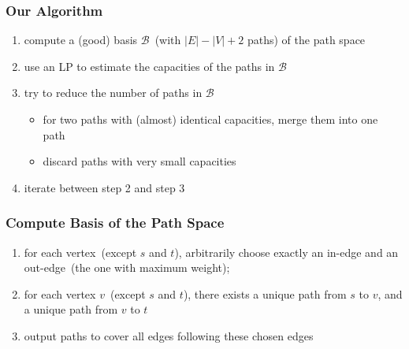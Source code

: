 \frame
{
	\frametitle{Our Algorithm}
	\begin{enumerate}
	\item compute a (good) basis $\mathcal{B}$~(with $|E|-|V|+2$ paths) of the path space
	\vspace{0.2cm}
	\item use an LP to estimate the capacities of the paths in $\mathcal{B}$
	\vspace{0.2cm}
	\item try to reduce the number of paths in $\mathcal{B}$
		\begin{itemize}
		\vspace{0.1cm}
		\item for two paths with (almost) identical capacities, merge them into one path
		\vspace{0.1cm}
		\item discard paths with very small capacities
		\end{itemize}
	\vspace{0.2cm}
	\item iterate between step 2 and step 3
	\end{enumerate}
}

\frame
{
	\frametitle{Compute Basis of the Path Space}

	\begin{enumerate}
	\item for each vertex~(except $s$ and $t$), arbitrarily choose exactly an in-edge and an out-edge~(the one with maximum weight);
	\vspace{1.2cm}
	
	\vspace{1.5cm}
	\item for each vertex $v$~(except $s$ and $t$), there exists a unique path from $s$ to $v$, and a unique path from $v$ to $t$
	\vspace{0.2cm}
	\item output paths to cover all edges following these chosen edges 
	\end{enumerate}

}

